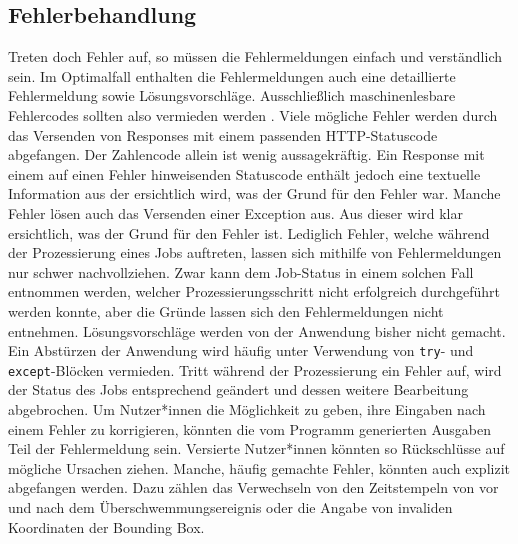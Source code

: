 \subsection{Fehlerbehandlung}
Treten doch Fehler auf, so müssen die Fehlermeldungen einfach und verständlich sein. Im Optimalfall enthalten die Fehlermeldungen auch eine detaillierte 
Fehlermeldung sowie Lösungsvorschläge. 
Ausschließlich maschinenlesbare Fehlercodes sollten also vermieden werden \cite{usability_engineering,nielsen_poster,heuristics_website}.
Viele mögliche Fehler werden durch das Versenden von Responses mit einem passenden HTTP-Statuscode abgefangen. Der Zahlencode allein ist wenig 
aussagekräftig. Ein Response mit einem auf einen Fehler hinweisenden Statuscode enthält jedoch eine textuelle Information aus der ersichtlich wird, 
was der Grund für den Fehler war. Manche Fehler lösen auch das Versenden einer Exception aus. Aus dieser wird klar ersichtlich, was der
Grund für den Fehler ist. Lediglich Fehler, welche während der Prozessierung eines Jobs auftreten, lassen sich mithilfe von Fehlermeldungen 
nur schwer nachvollziehen. Zwar kann dem Job-Status in einem solchen Fall entnommen werden, welcher Prozessierungsschritt nicht erfolgreich durchgeführt werden 
konnte, aber die Gründe lassen sich den Fehlermeldungen nicht entnehmen. Lösungsvorschläge werden von der Anwendung bisher nicht gemacht. 
Ein Abstürzen der Anwendung wird häufig unter Verwendung von \verb|try|- und \verb|except|-Blöcken 
vermieden. Tritt während der Prozessierung ein Fehler auf, wird der Status des Jobs entsprechend geändert und dessen weitere Bearbeitung abgebrochen. 
Um Nutzer*innen die Möglichkeit zu geben, ihre Eingaben nach einem Fehler zu korrigieren, könnten die vom Programm generierten Ausgaben Teil der Fehlermeldung sein. 
Versierte Nutzer*innen könnten so Rückschlüsse auf mögliche Ursachen ziehen. Manche, häufig gemachte Fehler, könnten auch explizit abgefangen werden. Dazu zählen 
das Verwechseln von den Zeitstempeln von vor und nach dem Überschwemmungsereignis oder die Angabe von invaliden Koordinaten der Bounding Box.  

